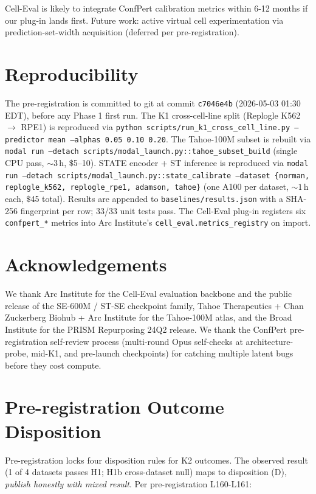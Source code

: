 \documentclass{article}
\begin{document}
Cell-Eval is likely to integrate ConfPert calibration metrics within 6-12 months if our plug-in lands first. Future work: active virtual cell experimentation via prediction-set-width acquisition (deferred per pre-registration).

\section*{Reproducibility}

The pre-registration is committed to git at commit \texttt{c7046e4b} (2026-05-03 01:30 EDT), before any Phase 1 first run. The K1 cross-cell-line split (Replogle K562 $\rightarrow$ RPE1) is reproduced via \texttt{python scripts/run\_k1\_cross\_cell\_line.py --predictor mean --alphas 0.05 0.10 0.20}. The Tahoe-100M subset is rebuilt via \texttt{modal run --detach scripts/modal\_launch.py::tahoe\_subset\_build} (single CPU pass, ${\sim}3$\,h, $\$$5--10). STATE encoder + ST inference is reproduced via \texttt{modal run --detach scripts/modal\_launch.py::state\_calibrate --dataset \{norman, replogle\_k562, replogle\_rpe1, adamson, tahoe\}} (one A100 per dataset, ${\sim}1$\,h each, $\$$45 total). Results are appended to \texttt{baselines/results.json} with a SHA-256 fingerprint per row; 33/33 unit tests pass. The Cell-Eval plug-in registers six \texttt{confpert\_*} metrics into Arc Institute's \texttt{cell\_eval.metrics\_registry} on import.

\section*{Acknowledgements}

We thank Arc Institute for the Cell-Eval evaluation backbone and the public release of the SE-600M / ST-SE checkpoint family, Tahoe Therapeutics + Chan Zuckerberg Biohub + Arc Institute for the Tahoe-100M atlas, and the Broad Institute for the PRISM Repurposing 24Q2 release. We thank the ConfPert pre-registration self-review process (multi-round Opus self-checks at architecture-probe, mid-K1, and pre-launch checkpoints) for catching multiple latent bugs before they cost compute.

\appendix

\section{Pre-registration Outcome Disposition}
\label{app:prereg}

Pre-registration locks four disposition rules for K2 outcomes. The observed result (1 of 4 datasets passes H1; H1b cross-dataset null) maps to disposition (D), \emph{publish honestly with mixed result}. Per pre-registration L160-L161:
\end{document}
